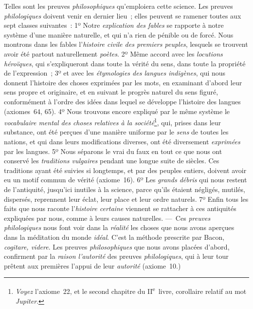 \documentclass[french,twoside]{book} %
\begin{document}
Telles sont les preuves {\itshape philosophiques} qu’emploiera cette science. Les preuves {\itshape philologiques} doivent venir en dernier lieu ; elles peuvent se ramener toutes aux sept classes suivantes : 1º Notre {\itshape explication des fables} se rapporte à notre système d’une manière naturelle, et qui n’a rien de  pénible ou de forcé. Nous montrons dans les fables l’{\itshape histoire civile des premiers peuples}, lesquels se trouvent avoir été partout naturellement {\itshape poètes}. 2º Même accord avec les {\itshape locutions héroïques}, qui s’expliqueront dans toute la vérité du sens, dans toute la propriété de l’expression ; 3º et avec les {\itshape étymologies des langues indigènes}, qui nous donnent l’histoire des choses exprimées par les mots, en examinant d’abord leur sens propre et originaire, et en suivant le progrès naturel du sens figuré, conformément à l’ordre des idées dans lequel se développe l’histoire des langues (axiomes 64, 65). 4º Nous trouvons encore expliqué par le même système le {\itshape vocabulaire mental des choses relatives à la société}\footnote{{\itshape Voyez} l’axiome 22, et le second chapitre du II\textsuperscript{e} livre, corollaire relatif au mot {\itshape Jupiter}.}, qui, prises dans leur substance, ont été perçues d’une manière uniforme par le {\itshape sens} de toutes les nations, et qui dans leurs modifications diverses, ont été diversement {\itshape exprimées} par les langues. 5º Nous séparons le vrai du faux en tout ce que nous ont conservé les {\itshape traditions vulgaires} pendant une longue suite de siècles. Ces traditions ayant été suivies si longtemps, et par des peuples entiers, doivent avoir eu un motif commun de vérité (axiome 16). 6º Les {\itshape grands débris} qui nous restent de l’antiquité, jusqu’ici inutiles à la science, parce qu’ils étaient négligés, mutilés, dispersés, reprennent leur éclat, leur place et leur ordre naturels.  7º Enfin tous les faits que nous raconte l’{\itshape histoire certaine} viennent se rattacher à ces antiquités expliquées par nous, comme à leurs causes naturelles. — Ces {\itshape preuves philologiques} nous font voir dans la {\itshape réalité} les choses que nous avons aperçues dans la méditation du monde {\itshape idéal}. C’est la méthode prescrite par Bacon, {\itshape cogitare, videre}. Les preuves {\itshape philosophiques} que nous avons placées d’abord, confirment par la {\itshape raison l’autorité} des preuves {\itshape philologiques}, qui à leur tour prêtent aux premières l’appui de leur {\itshape autorité} (axiome 10.)\par
\end{document}

